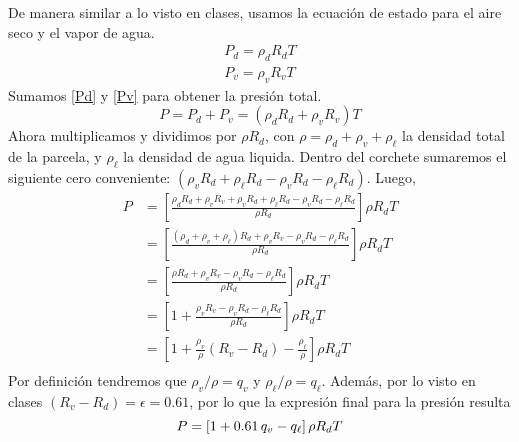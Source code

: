 \documentclass[class=article, crop=true]{standalone}
\begin{document}
De manera similar a lo visto en clases, usamos la ecuación de estado para el aire seco y el vapor de agua.
\begin{align}
    P_d = \rho_d R_d T\label{Pd}\\ 
    P_v = \rho_v R_v T\label{Pv}
\end{align}
Sumamos \eqref{Pd} y \eqref{Pv} para obtener la presión total.
$$    P = P_d + P_v = (\rho_d R_d + \rho_v R_v) T $$
Ahora multiplicamos y dividimos por $\rho R_d$, con $\rho = \rho_d + \rho_v + \rho_\ell$ la densidad total de la parcela, y $\rho_\ell$ la densidad de agua liquida.
Dentro del corchete sumaremos el siguiente cero conveniente: $(\rho_v R_d + \rho_\ell R_d - \rho_v R_d - \rho_\ell R_d)$. Luego, 
\begin{align*}
    P &= \left[ \frac{\rho_d R_d + \rho_v R_v + \rho_v R_d + \rho_\ell R_d - \rho_v R_d - \rho_\ell R_d }{\rho R_d} \right]\rho R_d T\\
    &=  \left[ \frac{(\rho_d + \rho_v + \rho_\ell) R_d +  \rho_v R_v - \rho_v R_d - \rho_\ell R_d }{\rho R_d} \right]\rho R_d T\\
    &=  \left[ \frac{\rho R_d +  \rho_v R_v - \rho_v R_d - \rho_\ell R_d }{\rho R_d} \right]\rho R_d T\\
    &=  \left[ 1 + \frac{ \rho_v R_v - \rho_v R_d - \rho_\ell R_d }{\rho R_d} \right]\rho R_d T\\
    &=  \left[ 1 + \frac{ \rho_v }{\rho }(R_v - R_d) - \frac{\rho_\ell}{\rho} \right]\rho R_d T\\
\end{align*}
Por definición tendremos que $\rho_v/\rho = q_v$ y $\rho_\ell/\rho = q_\ell$. Además, por lo visto en clases $(R_v - R_d) = \epsilon = 0.61$, por lo que la expresión final para la presión resulta
\begin{equation}
    P=  \left[ 1 + 0.61\, q_v - q_\ell \right]\rho R_d T\\
\end{equation}
\end{document}
